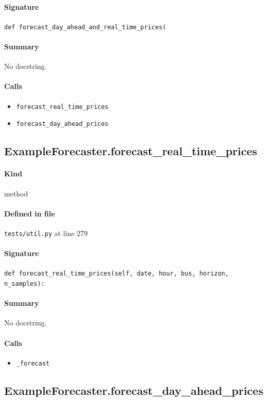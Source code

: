 \documentclass[11pt]{report}
\begin{document}
\paragraph{Signature} \texttt{def forecast\_day\_ahead\_and\_real\_time\_prices(}
\paragraph{Summary} No docstring.
\paragraph{Calls}
\begin{itemize}[leftmargin=*]
  \item \texttt{forecast\_real\_time\_prices}
  \item \texttt{forecast\_day\_ahead\_prices}
\end{itemize}
\subsection{ExampleForecaster.forecast\_real\_time\_prices}
\label{def:tests-util.py:ExampleForecaster.forecast_real_time_prices:L279}
\paragraph{Kind} method
\paragraph{Defined in file} \texttt{tests/util.py} at line 279
\paragraph{Signature} \texttt{def forecast\_real\_time\_prices(self, date, hour, bus, horizon, n\_samples):}
\paragraph{Summary} No docstring.
\paragraph{Calls}
\begin{itemize}[leftmargin=*]
  \item \texttt{\_forecast}
\end{itemize}
\subsection{ExampleForecaster.forecast\_day\_ahead\_prices}
\label{def:tests-util.py:ExampleForecaster.forecast_day_ahead_prices:L282}
\end{document}

